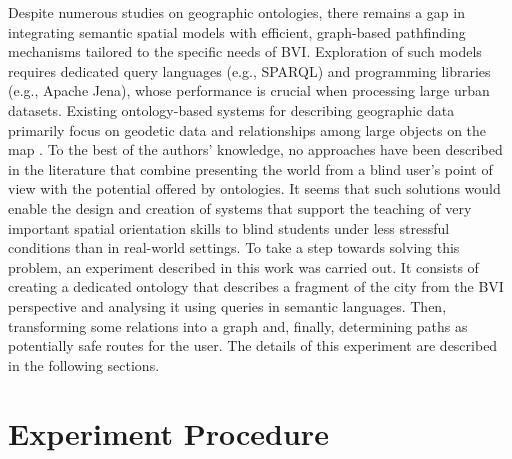 \documentclass[conference]{IEEEtran}
\begin{document}
Despite numerous studies on geographic ontologies, there remains a gap in integrating semantic spatial models with efficient, graph-based pathfinding mechanisms tailored to the specific needs of BVI.
Exploration of such models requires dedicated query languages (e.g., SPARQL) and programming libraries (e.g., Apache Jena), whose performance is crucial when processing large urban datasets.
Existing ontology-based systems for describing geographic data primarily focus on geodetic data and relationships among large objects on the map \cite{ranatunga2025}.
To the best of the authors' knowledge, no approaches have been described in the literature that combine presenting the world from a blind user's point of view with the potential offered by ontologies.
It seems that such solutions would enable the design and creation of systems that support the teaching of very important spatial orientation skills to blind students under less stressful conditions than in real-world settings.
To take a step towards solving this problem, an experiment described in this work was carried out.
It consists of creating a dedicated ontology that describes a fragment of the city from the BVI perspective and analysing it using queries in semantic languages.
Then, transforming some relations into a graph and, finally, determining paths as potentially safe routes for the user.
The details of this experiment are described in the following sections.

\section{Experiment Procedure}
\end{document}
